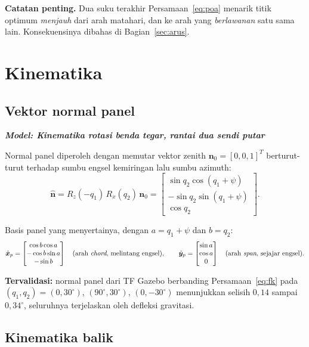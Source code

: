 \documentclass[11pt,a4paper]{article}
\newcommand{\nhat}{\hat{\bm{n}}}
\newcommand{\xp}{\hat{\bm{x}}_p}
\newcommand{\yp}{\hat{\bm{y}}_p}
\newcommand{\degg}{^\circ}
\newcommand{\model}[1]{\textbf{\textit{Model: #1}}}
\begin{document}
\textbf{Catatan penting.} Dua suku terakhir Persamaan~\eqref{eq:poa} menarik titik optimum \emph{menjauh}
dari arah matahari, dan ke arah yang \emph{berlawanan} satu sama lain. Konsekuensinya dibahas di
Bagian~\ref{sec:arus}.

\section{Kinematika}

\subsection{Vektor normal panel}

\model{Kinematika rotasi benda tegar, rantai dua sendi putar}

Normal panel diperoleh dengan memutar vektor zenith $\bm{n}_0 = [0,0,1]^T$ berturut-turut terhadap sumbu
engsel kemiringan lalu sumbu azimuth:
\begin{equation}
\nhat = R_z(-q_1)\, R_x(q_2)\, \bm{n}_0
= \begin{bmatrix}
\sin q_2 \cos(q_1 + \psi) \\
-\sin q_2 \sin(q_1 + \psi) \\
\cos q_2
\end{bmatrix}.
\label{eq:fk}
\end{equation}

Basis panel yang menyertainya, dengan $a = q_1 + \psi$ dan $b = q_2$:
\begin{equation}
\xp = \begin{bmatrix} \cos b \cos a \\ -\cos b \sin a \\ -\sin b \end{bmatrix}
\quad (\text{arah \emph{chord}, melintang engsel}), \qquad
\yp = \begin{bmatrix} \sin a \\ \cos a \\ 0 \end{bmatrix}
\quad (\text{arah \emph{span}, sejajar engsel}).
\end{equation}

\textbf{Tervalidasi:} normal panel dari TF Gazebo berbanding Persamaan~\eqref{eq:fk} pada
$(q_1,q_2) = (0,30\degg)$, $(90\degg,30\degg)$, $(0,-30\degg)$ menunjukkan selisih $0{,}14$ sampai
$0{,}34\degg$, seluruhnya terjelaskan oleh defleksi gravitasi.

\subsection{Kinematika balik}
\end{document}

